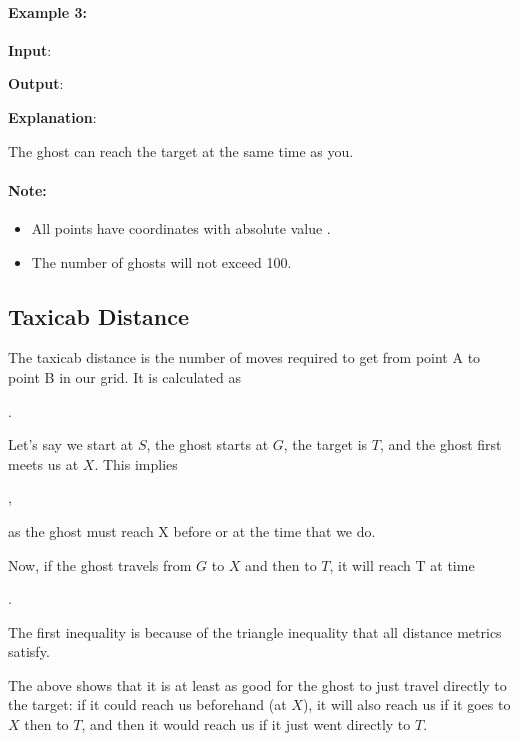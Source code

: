\paragraph{Example 3:}

\begin{flushleft}
\textbf{Input}: 



\textbf{Output}: 

\textbf{Explanation}: 

The ghost can reach the target at the same time as you.

\end{flushleft}

\paragraph{Note:}

\begin{itemize}
\item All points have coordinates with absolute value .
\item The number of ghosts will not exceed 100.
\end{itemize}

\subsection{Taxicab Distance}
The taxicab distance is the number of moves required to get from point A to point B in our grid. It is calculated as 

.

Let's say we start at $S$, the ghost starts at $G$, the target is $T$, and the ghost first meets us at $X$. This implies 

, 

as the ghost must reach X before or at the time that we do.

Now, if the ghost travels from $G$ to $X$ and then to $T$, it will reach T at time 

.

The first inequality is because of the triangle inequality that all distance metrics satisfy.

The above shows that it is at least as good for the ghost to just travel directly to the target: if it could reach us beforehand (at $X$), it will also reach us if it goes to $X$ then to $T$, and then it would reach us if it just went directly to $T$.

